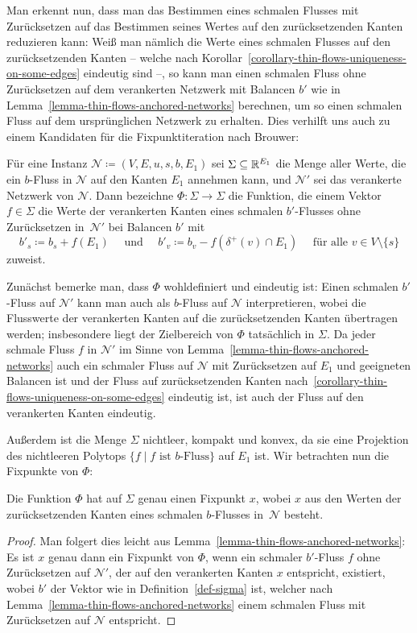 Man erkennt nun, dass man das Bestimmen eines schmalen Flusses mit Zurücksetzen auf das Bestimmen seines Wertes auf den zurücksetzenden Kanten reduzieren kann:
Weiß man nämlich die Werte eines schmalen Flusses auf den zurücksetzenden Kanten -- welche nach Korollar~\ref{corollary-thin-flows-uniqueness-on-some-edges} eindeutig sind --, so kann man einen schmalen Fluss ohne Zurücksetzen auf dem verankerten Netzwerk mit Balancen $b'$ wie in Lemma~\ref{lemma-thin-flows-anchored-networks} berechnen, um so einen schmalen Fluss auf dem ursprünglichen Netzwerk zu erhalten.
Dies verhilft uns auch zu einem Kandidaten für die Fixpunktiteration nach Brouwer:

\begin{definition}\label{def-sigma}
	Für eine \problemThinFlow Instanz $\mathcal{N}\coloneq (V, E, u, s, b, E_1)$ sei $\Sigma\subseteq \mathbb{R}^{E_1}$ die Menge aller Werte, die ein $b$-Fluss in $\mathcal{N}$ auf den Kanten $E_1$ annehmen kann, und $\mathcal{N}'$ sei das verankerte Netzwerk von $\mathcal{N}$.
	Dann bezeichne $\Phi: \Sigma \rightarrow \Sigma$ die Funktion, die einem Vektor $f\in\Sigma$ die Werte der verankerten Kanten eines schmalen $b'$-Flusses ohne Zurücksetzen in~$\mathcal{N}'$ bei Balancen $b'$ mit
	\[
	b'_s \coloneq b_s + f(E_1) \text{~~~ und ~~~} b'_v \coloneq b_v - f( \delta^+(v)\cap E_1) \text{~~~ für alle $v\in V\setminus \{ s \}$}
	\]
	zuweist.
\end{definition}

Zunächst bemerke man, dass $\Phi$ wohldefiniert und eindeutig ist:
Einen schmalen $b'$-Fluss auf $\mathcal{N}'$ kann man auch als $b$-Fluss auf $\mathcal{N}$ interpretieren, wobei die Flusswerte der verankerten Kanten auf die zurücksetzenden Kanten übertragen werden; insbesondere liegt der Zielbereich von $\Phi$ tatsächlich in $\Sigma$.
Da jeder schmale Fluss $f$ in $\mathcal{N}'$ im Sinne von Lemma~\ref{lemma-thin-flows-anchored-networks} auch ein schmaler Fluss auf $\mathcal{N}$ mit Zurücksetzen auf $E_1$ und geeigneten Balancen ist und der Fluss auf zurücksetzenden Kanten nach~\ref{corollary-thin-flows-uniqueness-on-some-edges} eindeutig ist, ist auch der Fluss auf den verankerten Kanten eindeutig.

Außerdem ist die Menge $\Sigma$ nichtleer, kompakt und konvex, da sie eine Projektion des nichtleeren Polytops $\{ f \mid \text{$f$ ist $b$-Fluss} \}$ auf $E_1$ ist.
Wir betrachten nun die Fixpunkte von $\Phi$:
\begin{proposition}
	Die Funktion $\Phi$ hat auf $\Sigma$ genau einen Fixpunkt $x$, wobei $x$ aus den Werten der zurücksetzenden Kanten eines schmalen $b$-Flusses in~$\mathcal{N}$ besteht.
\end{proposition}
\begin{proof}
	Man folgert dies leicht aus Lemma~\ref{lemma-thin-flows-anchored-networks}:
	Es ist $x$ genau dann ein Fixpunkt von $\Phi$, wenn ein schmaler $b'$-Fluss $f$ ohne Zurücksetzen auf $\mathcal{N}'$, der auf den verankerten Kanten $x$ entspricht, existiert, wobei $b'$ der Vektor wie in Definition~\ref{def-sigma} ist, welcher nach Lemma~\ref{lemma-thin-flows-anchored-networks} einem schmalen Fluss mit Zurücksetzen auf $\mathcal{N}$ entspricht.	
\end{proof}


